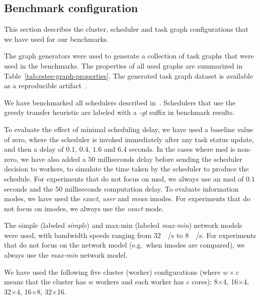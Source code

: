 \subsection{Benchmark configuration}
This section describes the cluster, scheduler and task graph configurations that we have used for
our benchmarks.

\begin{description}[wide=0pt]
	\item[Task graphs] The \estee{} graph generators were used to generate a collection of task graphs that
		were used in the benchmarks. The properties of all used graphs are summarized in
		Table~\ref{tab:estee-graph-properties}. The generated task graph dataset is available as a reproducible
		artifact~\cite{estee_graphs}.
	\item[Schedulers] We have benchmarked all schedulers described in~. Schedulers that use the
		greedy transfer heuristic are labeled with a \emph{-gt} suffix in benchmark results.
	\item[Scheduler parameters] To evaluate the effect of minimal scheduling delay, we have used a baseline value of zero, where
		the scheduler is invoked immediately after any task status update, and then a delay of
		$0.1$, $0.4$, $1.6$ and $6.4$
		seconds. In the cases where \gls{msd} is non-zero, we have also added a
		$50$ milliseconds delay before sending the scheduler decision to workers, to
		simulate the time taken by the scheduler to produce the schedule. For experiments that do not focus
		on \gls{msd}, we always use an \gls{msd} of $0.1$ seconds
		and the $50$ milliseconds computation delay. To evaluate information modes, we
		have used the \emph{exact}, \emph{user} and \emph{mean} imodes. For
		experiments that do not focus on imodes, we always use the \emph{exact} mode.
	\item[Network models] The simple (labeled \emph{simple}) and max-min (labeled \emph{max-min}) network
		models were used, with bandwidth speeds ranging from \SI{32}{\mebi\byte}/s to
		\SI{8}{\gibi\byte}/s. For experiments that do not focus on the network model (e.g.\ when imodes
		are compared), we always use the \emph{max-min} network model.
	\item[Clusters] We have used the following five cluster (worker) configurations (where $w \times c$ means
		that the cluster has $w$ workers and each worker has $c$
		cores):  8$\times$4, 16$\times$4, 32$\times$4,
		16$\times$8, 32$\times$16.
\end{description}


